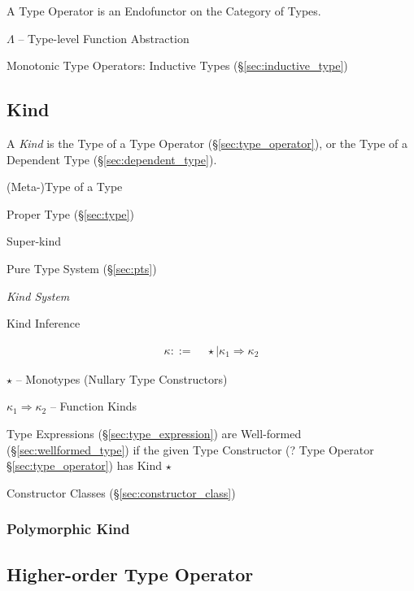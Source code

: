 A Type Operator is an Endofunctor on the Category of Types.

$\Lambda$ -- Type-level Function Abstraction

Monotonic Type Operators: Inductive Types (\S\ref{sec:inductive_type})



\subsection{Kind}\label{sec:kind}

A \emph{Kind} is the Type of a Type Operator
(\S\ref{sec:type_operator}), or the Type of a Dependent Type
(\S\ref{sec:dependent_type}).

(Meta-)Type of a Type

\fist Proper Type (\S\ref{sec:type})

Super-kind

Pure Type System (\S\ref{sec:pts})


\cite{jones95}


\emph{Kind System}

Kind Inference

\begin{align*}
  \kappa ::= &\; \star \mid \kappa_1 \Rightarrow \kappa_2
\end{align*}

$\star$ -- Monotypes (Nullary Type Constructors)

$\kappa_1 \Rightarrow \kappa_2$ -- Function Kinds

Type Expressions (\S\ref{sec:type_expression}) are Well-formed
(\S\ref{sec:wellformed_type}) if the given Type Constructor (? Type
Operator \S\ref{sec:type_operator}) has Kind $\star$

Constructor Classes (\S\ref{sec:constructor_class})



\subsubsection{Polymorphic Kind}\label{sec:polymorphic_kind}



\subsection{Higher-order Type Operator}
\label{sec:higherorder_typeoperator}


